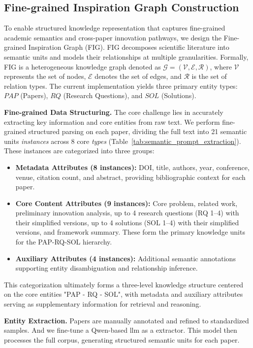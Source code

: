 \documentclass[runningheads]{llncs}
\begin{document}
\subsection{Fine-grained Inspiration Graph Construction}
\label{sec:graph_construction}

To enable structured knowledge representation that captures fine-grained academic semantics and cross-paper innovation pathways, we design the Fine-grained Inspiration Graph (FIG). FIG decomposes scientific literature into semantic units and models their relationships at multiple granularities. Formally, FIG is a heterogeneous knowledge graph denoted as $\mathcal{G} = (\mathcal{V}, \mathcal{E}, \mathcal{R})$, where $\mathcal{V}$ represents the set of nodes, $\mathcal{E}$ denotes the set of edges, and $\mathcal{R}$ is the set of relation types. The current implementation yields three primary entity types: $PAP$ (Papers), $RQ$ (Research Questions), and $SOL$ (Solutions).

\textbf{Fine-grained Data Structuring.} The core challenge lies in accurately extracting key information and core entities from raw text. We perform fine-grained structured parsing on each paper, dividing the full text into 21 semantic units \textit{instances} across 8 core \textit{types} (Table~\ref{tab:semantic_prompt_extraction}). These instances are categorized into three groups:
\begin{itemize}[leftmargin=*]
    \item \textbf{Metadata Attributes (8 instances):} DOI, title, authors, year, conference, venue, citation count, and abstract, providing bibliographic context for each paper.
    \item \textbf{Core Content Attributes (9 instances):} Core problem, related work, preliminary innovation analysis, up to 4 research questions (RQ 1--4) with their simplified versions, up to 4 solutions (SOL 1--4) with their simplified versions, and framework summary. These form the primary knowledge units for the PAP-RQ-SOL hierarchy.
    \item \textbf{Auxiliary Attributes (4 instances):} Additional semantic annotations supporting entity disambiguation and relationship inference.
\end{itemize}
This categorization ultimately forms a three-level knowledge structure centered on the core entities "PAP - RQ - SOL", with metadata and auxiliary attributes serving as supplementary information for retrieval and reasoning.

\textbf{Entity Extraction.} Papers are manually annotated and refined to standardized samples. And we fine-tune a Qwen-based llm as a extractor. This model then processes the full corpus, generating structured semantic units for each paper.
\end{document}
